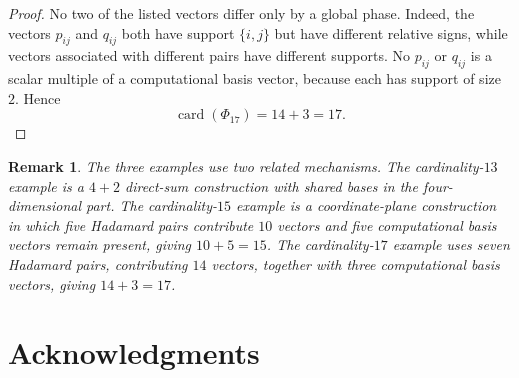 \documentclass[a4paper,11pt]{article}
\newcommand{\card}{\operatorname{card}}
\newtheorem{remark}{Remark}
\begin{document}
\begin{proof}
No two of the listed vectors differ only by a global phase. Indeed, the vectors
$p_{ij}$ and $q_{ij}$ both have support $\{i,j\}$ but have different relative
signs, while vectors associated with different pairs have different supports.
No $p_{ij}$ or $q_{ij}$ is a scalar multiple of a computational basis vector,
because each has support of size $2$. Hence
\[
  \card(\Phi_{17})=14+3=17.
\]
\end{proof}

\begin{remark}
The three examples use two related mechanisms. The cardinality-$13$ example is a
$4+2$ direct-sum construction with shared bases in the four-dimensional part.
The cardinality-$15$ example is a coordinate-plane construction in which five
Hadamard pairs contribute $10$ vectors and five computational basis vectors
remain present, giving $10+5=15$. The cardinality-$17$ example uses seven
Hadamard pairs, contributing $14$ vectors, together with three computational
basis vectors, giving $14+3=17$.
\end{remark}
\section*{Acknowledgments}
\end{document}
